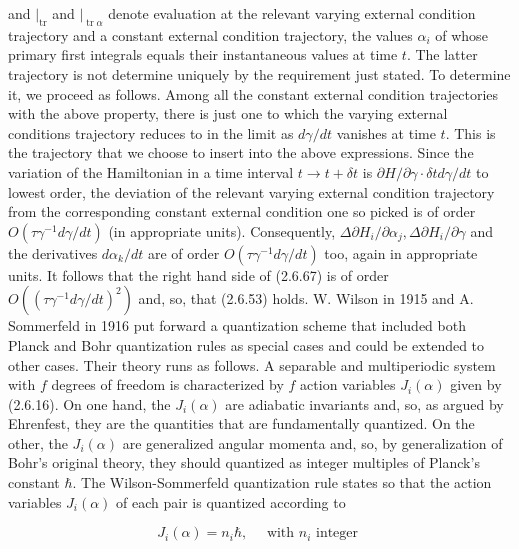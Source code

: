 \documentclass{article}
\begin{document}
and $\left.\right|_{\operatorname{tr}}$ and $\left.\right|_{\operatorname{tr} \alpha}$ denote evaluation at the relevant varying external condition trajectory and a constant external condition trajectory, the values $\alpha_{i}$ of whose primary first integrals equals their instantaneous values at time $t$. The latter trajectory is not determine uniquely by the requirement just stated. To determine it, we proceed as follows. Among all the constant external condition trajectories with the above property, there is just one to which the varying external conditions trajectory reduces to in the limit as $d \gamma / d t$ vanishes at time $t$. This is the trajectory that we choose to insert into the above expressions. Since the variation of the Hamiltonian in a time interval $t \rightarrow t+\delta t$
is $\partial H / \partial \gamma \cdot \delta t d \gamma / d t$ to lowest order, the deviation of the relevant varying external condition trajectory from the corresponding constant external condition one so picked is of order $O\left(\tau \gamma^{-1} d \gamma / d t\right)$ (in appropriate units). Consequently, $\Delta \partial H_{i} / \partial \alpha_{j}, \Delta \partial H_{i} / \partial \gamma$ and the derivatives $d \alpha_{k} / d t$ are of order $O\left(\tau \gamma^{-1} d \gamma / d t\right)$ too, again in appropriate units. It follows that the right hand side of (2.6.67) is of order $O\left(\left(\tau \gamma^{-1} d \gamma / d t\right)^{2}\right)$ and, so, that (2.6.53) holds.
W. Wilson in 1915 and A. Sommerfeld in 1916 put forward a quantization scheme that included both Planck and Bohr quantization rules as special cases and could be extended to other cases. Their theory runs as follows. A separable and multiperiodic system with $f$ degrees of freedom is characterized by $f$ action variables $J_{i}(\alpha)$ given by (2.6.16). On one hand, the $J_{i}(\alpha)$ are adiabatic invariants and, so, as argued by Ehrenfest, they are the quantities that are fundamentally quantized. On the other, the $J_{i}(\alpha)$ are generalized angular momenta and, so, by generalization of Bohr's original theory, they should quantized as integer multiples of Planck's constant $\hbar$. The Wilson-Sommerfeld quantization rule states so that the action variables $J_{i}(\alpha)$ of each pair is quantized according to
 
\begin{equation*}
J_{i}(\alpha)=n_{i} \hbar, \quad \text { with } n_{i} \text { integer } \tag{2.6.69}
\end{equation*}
 
\end{document}
